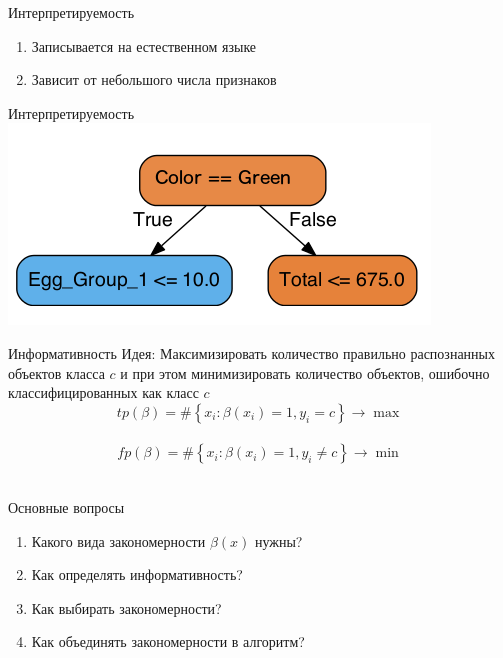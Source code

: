\documentclass[10pt]{beamer}
\begin{document}
\begin{frame}{Интерпретируемость}
	\begin{enumerate}
		\item Записывается на естественном языке
		\item Зависит от небольшого числа признаков
	\end{enumerate}
\end{frame}

\begin{frame}{Интерпретируемость}
  \centering
	\includegraphics[width=\textwidth, height=0.8 \textheight, keepaspectratio]{images/beta1}
\end{frame}

\begin{frame}{Информативность}
  \alert{Идея}: Максимизировать количество правильно распознанных объектов класса $c$ и при этом минимизировать количество объектов, ошибочно классифицированных как класс $c$
  \pause
	\bigbreak
	$${ tp(\beta) = \# \left\{ x_i: \beta(x_i) = 1 , y_i = c \right\} \rightarrow \max }$$\\
	\pause
  \bigbreak
	$${ fp(\beta) = \# \left\{ x_i: \beta(x_i) = 1 , y_i \neq c \right\} \rightarrow \min }$$\\		
\end{frame}

\begin{frame}{Основные вопросы}
	\begin{enumerate}
		\item Какого вида закономерности $\beta(x)$ нужны?
		\item Как определять информативность? 
		\item Как выбирать закономерности?
		\item Как объединять закономерности в алгоритм?
	\end{enumerate}
\end{frame}
\end{document}

